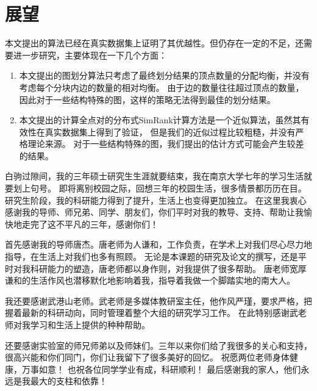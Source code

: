 \documentclass[master]{njuthesis}
\begin{document}
\section{展望}
本文提出的算法已经在真实数据集上证明了其优越性。但仍存在一定的不足，还需要进一步研究，主要体现在一下几个方面：
\begin{enumerate}
 \item 本文提出的图划分算法只考虑了最终划分结果的顶点数量的分配均衡，并没有考虑每个分块内边的数量的相对均衡。
 由于边的数量往往超过顶点的数量，因此对于一些结构特殊的图，这样的策略无法得到最佳的划分结果。
 
 \item 本文提出的计算全点对的分布式SimRank计算方法是一个近似算法，虽然其有效性在真实数据集上得到了验证，
 但是我们的近似过程比较粗糙，并没有严格理论来源。 对于一些结构特殊的图，我们提出的估计方式可能会产生较差的结果。
 
\end{enumerate}



\begin{acknowledgement}
白驹过隙间，我的三年硕士研究生生涯就要结束，我在南京大学七年的学习生活就要划上句号。
即将离别校园之际，回想三年的校园生活，很多情景都历历在目。
研究生阶段，我的科研能力得到了提升，生活上也变得更加独立。
在这里我衷心感谢我的导师、师兄弟、同学、朋友们，你们平时对我的教导、支持、帮助让我愉快地走完了这不平凡的三年，感谢你们！

首先感谢我的导师唐杰。唐老师为人谦和，工作负责，在学术上对我们尽心尽力地指导，在生活上对我们也多有照顾。
无论是本课题的研究及论文的撰写，还是平时对我科研能力的塑造，唐老师都以身作则，对我提供了很多帮助。
唐老师宽厚谦和的生活作风也潜移默化地影响着我，指导着我做一个脚踏实地的南大人。

我还要感谢武港山老师。武老师是多媒体教研室主任，他作风严瑾，要求严格，把握着最新的科研动向，同时管理着整个大组的研究学习工作。
在此特别感谢武老师对我学习和生活上提供的种种帮助。

还要感谢实验室的师兄师弟以及师妹们。三年以来你们给了我很多的关心和支持，很高兴能和你们同门，你们让我留下了很多美好的回忆。
祝愿两位老师身体健康，万事如意！ 也祝各位同学学业有成，科研顺利！
最后感谢我的家人，他们永远是我最大的支柱和依靠！

\end{acknowledgement}

\nocite{*}

%
%
\end{document}
